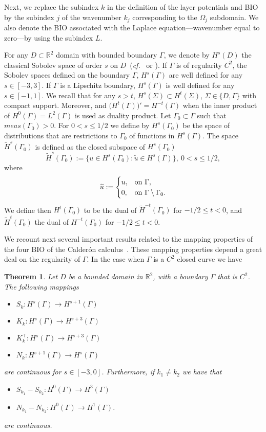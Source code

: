 \documentclass[11pt]{article}
\numberwithin{equation}{section}
\newtheorem{theorem}{Theorem}[section]
\begin{document}
Next, we replace  the subindex $k$ in the definition of the layer potentials and BIO by the subindex $j$ of the wavenumber $k_j$ corresponding to the $\Omega_j$ subdomain. We also denote the BIO associated with the Laplace equation---wavenumber equal to zero---by using the subindex $L$. 

For any $D\subset\mathbb{R}^2$ domain with bounded boundary $\Gamma$, we denote by $H^s(D)$ the classical Sobolev space of order $s$ on $D$~(\emph{cf.}~\cite[Ch. 3]{mclean:2000} or \cite[Ch. 2]{adams:2003}). If $\Gamma$ is of regularity $C^2$, the Sobolev spaces defined on the boundary $\Gamma$,  $H^s(\Gamma)$ are well defined for any $s\in[-3,3]$. If $\Gamma$ is a Lipschitz boundary, $H^s(\Gamma)$ is well defined for any $s\in[-1,1]$. We recall that for any $s>t$, $H^s(\Sigma)\subset H^t(\Sigma)$, $\Sigma\in\{D,\Gamma\}$ with compact support. Moreover, and
$\big(H^t(\Gamma)\big)'=H^{-t}(\Gamma)$ when the inner product of $H^0(\Gamma)=L^2(\Gamma)$ is used as duality product. Let $\Gamma_0\subset\Gamma$ such that $meas(\Gamma_0)>0$. For $0<s\leq 1/2$ we define by ${H}^s(\Gamma_0)$ be the space of distributions that are restrictions to $\Gamma_0$ of functions in $H^s(\Gamma)$. The space $\widetilde{H}^s(\Gamma_0)$ is defined as the closed subspace of $H^s(\Gamma_0)$
\[
\widetilde{H}^s(\Gamma_0):=\{u\in H^s(\Gamma_0):\widetilde{u}\in H^s(\Gamma)\},\ 0<s\leq 1/2,
\]
where
\[\widetilde{u}:=\begin{cases}
 u, & {\rm on}\  \Gamma, \\
 0,  & {\rm on}\ \Gamma\setminus\Gamma_0.
\end{cases}
\]
We define then $H^t(\Gamma_0)$ to be the dual of $\widetilde{H}^{-t}(\Gamma_0)$ for $-1/2\leq t<0$, and $\widetilde{H}^t(\Gamma_0)$ the dual of $H^{-t}(\Gamma_0)$ for $-1/2\leq t<0$.

We recount next several important results related to the mapping properties of the four BIO of the Calder\'{o}n calculus~\cite{dominguez2016well}. These mapping properties depend a great deal on the regularity of $\Gamma$. In the case when $\Gamma$ is a $C^2$ closed curve we have
\begin{theorem}\label{mappingS}
  Let  $D$ be a bounded domain in $\mathbb{R}^2$, with a boundary $\Gamma$ that is $C^2$. The following mappings
\begin{itemize}
\item $S_k:H^{s}(\Gamma)\to H^{s+1}(\Gamma)$
\item $K_k:H^{s}(\Gamma)\to H^{s+3}(\Gamma)$
\item $K^\top_k:H^{s}(\Gamma)\to H^{s+3}(\Gamma)$
\item $N_k:H^{s+1}(\Gamma)\to H^{s}(\Gamma)$
\end{itemize}
are continuous for $s\in[-3,0]$. Furthermore, if $k_1\ne k_2$ we have that  
\begin{itemize}
\item $S_{k_1}-S_{k_2}:H^{0}(\Gamma)\to H^{3}(\Gamma)$
\item $N_{k_1}-N_{k_2}:H^{0}(\Gamma)\to H^{1}(\Gamma)$.
\end{itemize}
are continuous. 
\end{theorem}
\end{document}
